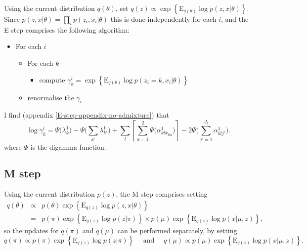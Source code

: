 \documentclass[12pt,a4paper,reqno]{article}
\newcommand{\E}{\text{E}{}}
\newcommand{\(}{\left(}
\newcommand{\)}{\right)}
\newcommand{\|}{\arrowvert}
\renewcommand{\digamma}{\Psi}
\begin{document}
Using the current distribution $q(\theta)$, set $q(z) \propto \exp\left\{\E_{q(\theta)} \log p(z,x|\theta)\right\}$. Since $p(z,x|\theta) = \prod_{i} p(z_{i},x_{i}|\theta)$ this is done independently for each $i$, and the E step comprises the following algorithm:
\begin{itemize}
\item For each $i$
  \begin{itemize}
  \item For each $k$
    \begin{itemize}
    \item compute $\gamma^{i}_{k} = \exp\left\{\E_{q(\theta)} \log p(z_{i}=k,x_{i}|\theta)\right\}$
    \end{itemize}
  \item renormalise the $\gamma_{i\cdot}$
  \end{itemize}
\end{itemize}
I find (appendix \ref{E-step-appendix-no-admixture}) that
\begin{equation*}
\log \gamma^{i}_{k} = \digamma\Big(\lambda^{1}_{k}\Big) - \digamma\Big(\sum_{k'}\lambda^{1}_{k'}\Big) + \sum_{l} \left[\sum_{a=1}^{2} \digamma\Big(\alpha^{1}_{klx_{lia}}\Big)\right] - 2\digamma\Big(\sum_{j'=1}^{J_{l}}\alpha^{1}_{klj'}\Big).
\end{equation*}
where $\digamma$ is the digamma function.

\subsection{M step}
Using the current distribution $p(z)$, the M step comprises setting
\begin{eqnarray*}
q(\theta) &\propto& p(\theta)\exp\left\{\E_{q(z)} \log p(z,x|\theta)\right\} \\
&=& 
p(\pi)\exp\left\{\E_{q(z)} \log p(z|\pi)\right\} \times 
p(\mu)\exp\left\{\E_{q(z)} \log p(x|\mu,z)\right\},
\end{eqnarray*}
so the updates for $q(\pi)$ and $q(\mu)$ can be performed separately, by setting
\begin{equation*}
  q(\pi) \propto p(\pi)\exp\left\{\E_{q(z)} \log p(z|\pi)\right\}
  \text{~~~~and~~~~}
  q(\mu) \propto p(\mu)\exp\left\{\E_{q(z)} \log p(x|\mu,z)\right\}.
\end{equation*}
\end{document}
